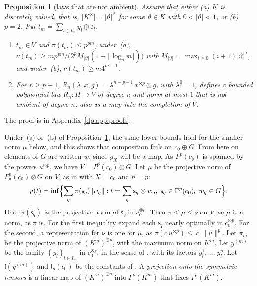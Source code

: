 \documentclass[11pt]{amsart}
\newtheorem{proposition}[theorem]{Proposition}
\theoremstyle{definition}
\theoremstyle{remark}
\numberwithin{equation}{section}
\newcommand{\Z}{\mathbb Z}
\newcommand{\abs}[1]{\lvert #1\rvert}
\newcommand{\norm}[1]{\lVert #1\rVert}
\theoremstyle{plain}
\theoremstyle{definition}
\theoremstyle{plain}
\begin{document}
\begin{proposition}[laws that are not ambient]\label{dp:prop:nonambient}
Assume that either (a) $K$ is discretely valued, that is, $\abs{K^\times}=\abs\vartheta^{\Z}$ for some $\vartheta\in K$ with $0<\abs\vartheta<1$, or (b) $p=2$. Put $t_m=\sum_{l\in I_m}y_l\otimes\varepsilon_l$.
\begin{enumerate}
\item $t_m\in V$ and $\pi(t_m)\le p^{pm}$; under~(a), $\nu(t_m)\ge mp^{pm}/\bigl(2^pM_{\abs\vartheta}(1+\lfloor\log_pm\rfloor)\bigr)$ with $M_{\abs\vartheta}=\max_{i\ge0}(i+1)\abs\vartheta^{\,i}$, and under~(b), $\nu(t_m)\ge m4^{m-1}$.
\item For $n\ge p+1$, $R_n(\lambda,x,g)=\lambda^{n-p-1}\,x^{\otimes p}\otimes g$, with $\lambda^0=1$, defines a bounded polynomial law $R_n\colon H\to V$ of degree $n$ and norm at most $1$ that is not ambient of degree $n$, also as a map into the completion of $V$.
\end{enumerate}
\end{proposition}
The proof is in Appendix~\ref{dp:app:proofs}.

Under~(a) or~(b) of Proposition~\ref{dp:prop:nonambient}, the same lower bounds hold for the smaller norm $\mu$ below, and this shows that composition fails on $c_0\oplus G$. From here on elements of $G$ are written $w$, since $g_X$ will be a map. As $\Gamma^p(c_0)$ is spanned by the powers $u^{\otimes p}$, we have $V=\Gamma^p(c_0)\otimes G$. Let $\mu$ be the projective norm of $\Gamma^p_\pi(c_0)\otimes G$ on $V$, as in \cite[(14.4)]{I} with $X=c_0$ and $n=p$:
\[
 \mu(t)=\inf\Bigl\{\sum_q\pi(\mathsf s_q)\norm{w_q}:t=\sum_q\mathsf s_q\otimes w_q,\ \mathsf s_q\in\Gamma^p(c_0),\ w_q\in G\Bigr\}.
\]
Here $\pi(\mathsf s_q)$ is the projective norm of $\mathsf s_q$ in $c_0^{\otimes p}$. Then $\pi\le\mu\le\nu$ on $V$, so $\mu$ is a norm, as $\pi$ is. For the first inequality expand each $\mathsf s_q$ nearly optimally in $c_0^{\otimes p}$. For the second, a representation for $\nu$ is one for $\mu$, as $\pi(c\,u^{\otimes p})\le\abs c\norm u^p$. Let $\pi_m$ be the projective norm of $(K^m)^{\otimes p}$, with the maximum norm on $K^m$. Let $y^{(m)}$ be the family $(y_l)_{l\in I_m}$ in $c_0^{\otimes p}$, in the sense of \cite[Definition~14.15]{I}, with its factors $y_l^1,\dots,y_l^p$. Let $\mathfrak l(y^{(m)})$ and $\mathfrak l_p(c_0)$ be the constants of \cite[(14.3)]{I}. A \emph{projection onto the symmetric tensors} is a linear map of $(K^m)^{\otimes p}$ into $\Gamma^p(K^m)$ that fixes $\Gamma^p(K^m)$.
\end{document}
